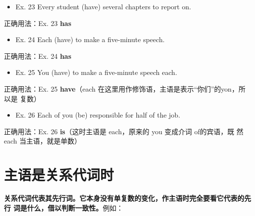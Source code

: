\begin{mybox}
  \begin{itemize}
  \item   Ex. 23 Every student (have) several chapters to report on.
  \end{itemize}

  \tcblower

  正确用法：Ex. 23 \textbf{has}
\end{mybox}

\begin{mybox}

  \begin{itemize}
  \item   Ex. 24 Each (have) to make a five-minute speech.
  \end{itemize}

  \tcblower

  正确用法：Ex. 24 \textbf{has}
\end{mybox}

\begin{mybox}

  \begin{itemize}
  \item   Ex. 25 You (have) to make a five-minute speech each.
  \end{itemize}

  \tcblower

  正确用法：Ex. 25 \textbf{have}（each 在这里用作修饰语，主语是表示“你们”的yon，所以是
  复数）
\end{mybox}

\begin{mybox}

  \begin{itemize}
  \item   Ex. 26 Each of you (be) responsible for half of the job.
  \end{itemize}

  \tcblower

  正确用法：Ex. 26 \textbf{is}（这时主语是 each，原来的 you 变成介词 of的宾语，既
  然 each 当主语，就是单数）
\end{mybox}

\section{主语是关系代词时}

\textbf{关系代词代表其先行词。它本身没有单复数的变化，作主语时完全要看它代表的先行
  词是什么，借以判断一致性。}例如：

